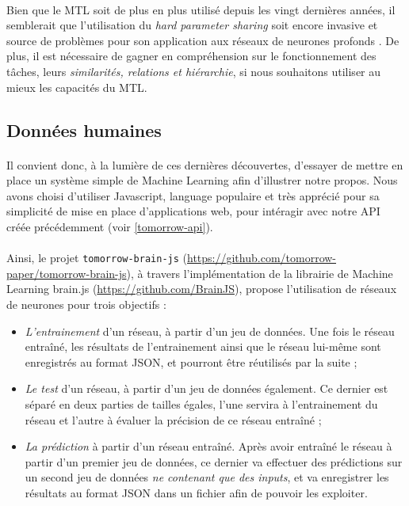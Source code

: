 \paragraph{} Bien que le MTL soit de plus en plus utilisé depuis les vingt dernières années, il semblerait que l'utilisation 
du \emph{hard parameter sharing} soit encore invasive et source de problèmes pour son application aux réseaux de neurones profonds
\cite{NeuralNets0}. De plus, il est nécessaire de gagner en compréhension sur le fonctionnement des tâches, leurs \emph{similarités,
relations et hiérarchie}, si nous souhaitons utiliser au mieux les capacités du MTL.


\subsection*{Données humaines}

\paragraph{} Il convient donc, à la lumière de ces dernières découvertes, d'essayer de mettre
en place un système simple de Machine Learning afin d'illustrer notre propos. Nous avons choisi
d'utiliser Javascript, language populaire et très apprécié pour sa simplicité de mise en place
d'applications web, pour intéragir avec notre API créée précédemment (voir \ref{tomorrow-api}).

\paragraph{} Ainsi, le projet \lstinline{tomorrow-brain-js} (\url{https://github.com/tomorrow-paper/tomorrow-brain-js}), 
à travers l'implémentation de la librairie de Machine Learning brain.js (\url{https://github.com/BrainJS}), propose
l'utilisation de réseaux de neurones pour trois objectifs :

\begin{itemize}
    \item \emph{L'entrainement} d'un réseau, à partir d'un jeu de données. Une fois le réseau
    entraîné, les résultats de l'entrainement ainsi que le réseau lui-même sont enregistrés au format
    JSON, et pourront être réutilisés par la suite ;
    \item \emph{Le test} d'un réseau, à partir d'un jeu de données également. Ce dernier est
    séparé en deux parties de tailles égales, l'une servira à l'entrainement du réseau et l'autre
    à évaluer la précision de ce réseau entraîné ;
    \item \emph{La prédiction} à partir d'un réseau entraîné. Après avoir entraîné le réseau
    à partir d'un premier jeu de données, ce dernier va effectuer des prédictions sur un second
    jeu de données \emph{ne contenant que des inputs}, et va enregistrer les résultats au format
    JSON dans un fichier afin de pouvoir les exploiter.
\end{itemize}

